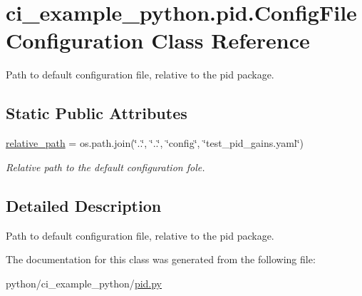 \hypertarget{classci__example__python_1_1pid_1_1ConfigFileConfiguration}{}\section{ci\+\_\+example\+\_\+python.\+pid.\+Config\+File\+Configuration Class Reference}
\label{classci__example__python_1_1pid_1_1ConfigFileConfiguration}


Path to default configuration file, relative to the pid package.  


\subsection*{Static Public Attributes}
\begin{DoxyCompactItemize}
\item 
\mbox{\label{classci__example__python_1_1pid_1_1ConfigFileConfiguration_a41a94840f25fb7d85c0e2ee23d3c636d}} 
\hyperlink{classci__example__python_1_1pid_1_1ConfigFileConfiguration_a41a94840f25fb7d85c0e2ee23d3c636d}{relative\+\_\+path} = os.\+path.\+join(\char`\"{}..\char`\"{}, \char`\"{}..\char`\"{}, \char`\"{}config\char`\"{}, \char`\"{}test\+\_\+pid\+\_\+gains.\+yaml\char`\"{})
\begin{DoxyCompactList}\small\item\em Relative path to the default configuration fole. \end{DoxyCompactList}\end{DoxyCompactItemize}


\subsection{Detailed Description}
Path to default configuration file, relative to the pid package. 

The documentation for this class was generated from the following file\+:\begin{DoxyCompactItemize}
\item 
python/ci\+\_\+example\+\_\+python/\hyperlink{pid_8py}{pid.\+py}\end{DoxyCompactItemize}
